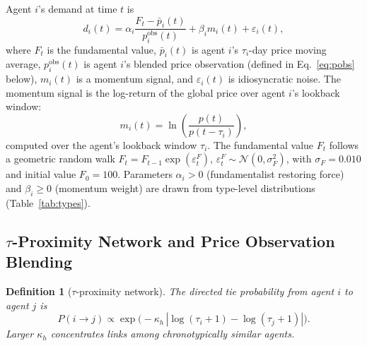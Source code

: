 \documentclass[10pt,twocolumn]{article}
\newtheorem{definition}{Definition}
\begin{document}
Agent $i$'s demand at time $t$ is
\begin{equation}
  d_i(t) = \alpha_i \frac{F_t - \bar{p}_i(t)}{p^{\mathrm{obs}}_i(t)}
          + \beta_i m_i(t) + \varepsilon_i(t),
  \label{eq:demand}
\end{equation}
where $F_t$ is the fundamental value, $\bar{p}_i(t)$ is agent $i$'s
$\tau_i$-day price moving average, $p^{\mathrm{obs}}_i(t)$ is agent $i$'s blended price observation (defined in Eq.~\eqref{eq:pobs} below), $m_i(t)$ is a momentum signal, and
$\varepsilon_i(t)$ is idiosyncratic noise.
The momentum signal is the log-return of the global price over agent $i$'s lookback window:
\begin{equation}
  m_i(t) = \ln\!\left(\frac{p(t)}{p(t - \tau_i)}\right),
  \label{eq:momentum}
\end{equation}
computed over the agent's lookback window $\tau_i$.
The fundamental value $F_t$ follows a geometric random walk
$F_t = F_{t-1}\exp(\varepsilon_t^F)$, $\varepsilon_t^F \sim \mathcal{N}(0,\sigma_F^2)$,
with $\sigma_F = 0.010$ and initial value $F_0 = 100$.
Parameters $\alpha_i > 0$ (fundamentalist restoring force) and
$\beta_i \geq 0$ (momentum weight) are drawn from type-level distributions
(Table~\ref{tab:types}).

\subsection{$\tau$-Proximity Network and Price Observation Blending}

\begin{definition}[$\tau$-proximity network]
The directed tie probability from agent $i$ to agent $j$ is
\[
  P(i \to j) \propto
  \exp\!\bigl(-\kappa_h \,|\log(\tau_i+1) - \log(\tau_j+1)|\bigr).
\]
Larger $\kappa_h$ concentrates links among chronotypically similar agents.
\end{definition}
\end{document}
